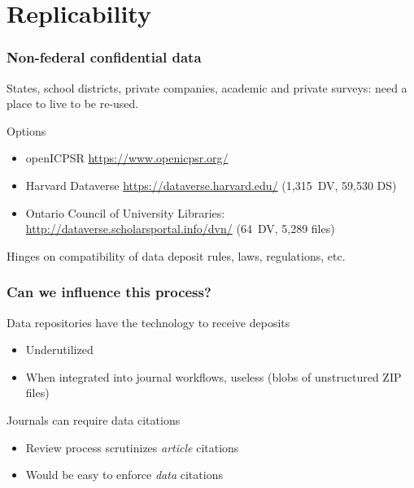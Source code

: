 \section{Replicability}


\begin{frame}
	\frametitle{Non-federal confidential data}
	States, school districts, private companies, academic and private surveys: need a place to live to be re-used.
	\begin{block}{Options}
		\begin{itemize}
			\item openICPSR \url{https://www.openicpsr.org/}
			\item Harvard Dataverse \url{https://dataverse.harvard.edu/} {\footnotesize (1,315\ DV, 59,530 DS)}
			\item Ontario Council of University Libraries: \url{http://dataverse.scholarsportal.info/dvn/} {\footnotesize (64\ DV, 5,289 files)}
		\end{itemize}
	\end{block}
	Hinges on compatibility of data deposit rules, laws, regulations, etc.
\end{frame}


\begin{frame}
	\frametitle{Can we influence this process?}
	\begin{block}{Data repositories have the technology to receive deposits}
		\begin{itemize}
			\item Underutilized
			\item When integrated into journal workflows, useless (blobs of unstructured ZIP files)
		\end{itemize}
	\end{block}
	\begin{block}{Journals can require data citations}
		\begin{itemize}
			\item Review process scrutinizes \textit{article} citations
			\item Would be easy to enforce \textit{data} citations
		\end{itemize}
	\end{block}
\end{frame}

